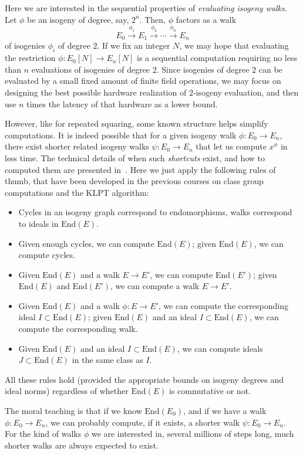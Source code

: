 \documentclass{article}
\def\End{\mathrm{End}}
\begin{document}
Here we are interested in the sequential properties of
\emph{evaluating isogeny walks}.  Let $\phi$ be an isogeny of degree,
say, $2^n$. Then, $\phi$ factors as a walk
\[E_0 \overset{\phi_1}{\longrightarrow} E_1
  \overset{\phi_2}{\longrightarrow} \cdots
  \overset{\phi_n}{\longrightarrow} E_n\] of isogenies $\phi_i$ of
degree $2$.  If we fix an integer $N$, we may hope that evaluating the
restriction $\phi : E_0[N] \to E_n[N]$ is a sequential computation
requiring no less than $n$ evaluations of isogenies of degree $2$.
Since isogenies of degree $2$ can be evaluated by a small fixed amount
of finite field operations, we may focus on designing the best
possible hardware realization of $2$-isogeny evaluation, and then use
$n$ times the latency of that hardware as a lower bound.

However, like for repeated squaring, some known structure helps
simplify computations.  It is indeed possible that for a given isogeny
walk $\phi:E_0\to E_n$, there exist shorter related isogeny walks
$\psi:E_0\to E_n$ that let us compute $x^\phi$ in less time.  The
technical details of when such \emph{shortcuts} exist, and how to
computed them are presented in~\cite{AC:DMPS19}.  Here we just apply
the following rules of thumb, that have been developed in the previous
courses on class group computations and the KLPT algorithm:
\begin{itemize}
\item Cycles in an isogeny graph correspond to endomorphisms, walks
  correspond to ideals in $\End(E)$.
\item Given enough cycles, we can compute $\End(E)$; given $\End(E)$,
  we can compute cycles.
\item Given $\End(E)$ and a walk $E\to E'$, we can compute $\End(E')$;
  given $\End(E)$ and $\End(E')$, we can compute a walk $E\to E'$.
\item Given $\End(E)$ and a walk $\phi:E\to E'$, we can compute the
  corresponding ideal $I\subset\End(E)$; given $\End(E)$ and an ideal
  $I\subset\End(E)$, we can compute the corresponding walk.
\item Given $\End(E)$ and an ideal $I\subset\End(E)$, we can compute
  ideals $J\subset\End(E)$ in the same class as $I$.
\end{itemize}
All these rules hold (provided the appropriate bounds on isogeny
degrees and ideal norms) regardless of whether $\End(E)$ is
commutative or not.

The moral teaching is that if we know $\End(E_0)$, and if we have a
walk $\phi:E_0\to E_n$, we can probably compute, if it exists, a
shorter walk $\psi:E_0\to E_n$.  For the kind of walks $\phi$ we are
interested in, several millions of steps long, much shorter walks are
always expected to exist.
\end{document}
